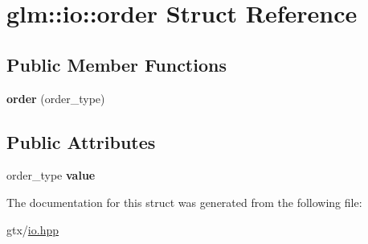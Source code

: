 \hypertarget{structglm_1_1io_1_1order}{\section{glm\-:\-:io\-:\-:order Struct Reference}
\label{structglm_1_1io_1_1order}
}
\subsection*{Public Member Functions}
\begin{DoxyCompactItemize}
\item 
\hypertarget{structglm_1_1io_1_1order_abe9beee89febdb5046c9e7ca331fbd68}{{\bfseries order} (order\-\_\-type)}\label{structglm_1_1io_1_1order_abe9beee89febdb5046c9e7ca331fbd68}

\end{DoxyCompactItemize}
\subsection*{Public Attributes}
\begin{DoxyCompactItemize}
\item 
\hypertarget{structglm_1_1io_1_1order_aa8788dd0568bacd081d02bd5aca9889b}{order\-\_\-type {\bfseries value}}\label{structglm_1_1io_1_1order_aa8788dd0568bacd081d02bd5aca9889b}

\end{DoxyCompactItemize}


The documentation for this struct was generated from the following file\-:\begin{DoxyCompactItemize}
\item 
gtx/\hyperlink{io_8hpp}{io.\-hpp}\end{DoxyCompactItemize}
